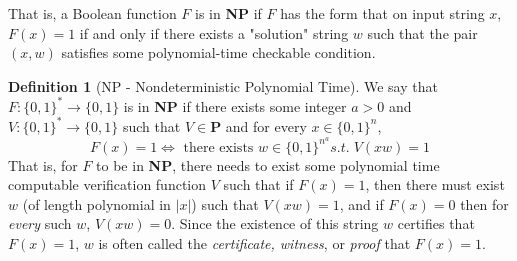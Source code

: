 \documentclass[a4paper, 12pt]{report}
\theoremstyle{remark}
\theoremstyle{definition}
\newtheorem{definition}{Definition}[section]
\begin{document}
That is, a Boolean function $F$ is in \textbf{NP} if $F$ has the form that on input string $x$, $F(x) = 1$ if and only if there exists a "solution" string $w$ such that the pair $(x, w)$ satisfies some polynomial-time checkable condition. 

\begin{definition}[NP - Nondeterministic Polynomial Time]
We say that $F: \{0,1\}^* \longrightarrow \{0,1\}$ is in \textbf{NP} if there exists some integer $a > 0$ and $V: \{0,1\}^* \longrightarrow \{0,1\}$ such that $V \in \mathbf{P}$ and for every $x \in \{0,1\}^n$, 
\[F(x) = 1 \iff \text{ there exists } w \in \{0,1\}^{n^a} s.t. \; V(x w) = 1\]
That is, for $F$ to be in \textbf{NP}, there needs to exist some polynomial time computable verification function $V$ such that if $F(x) = 1$, then there must exist $w$ (of length polynomial in $|x|$) such that $V(x w) = 1$, and if $F(x) = 0$ then for \textit{every} such $w$, $V(xw) = 0$. Since the existence of this string $w$ certifies that $F(x) = 1$, $w$ is often called the \textit{certificate, witness}, or \textit{proof} that $F(x) = 1$. 
\end{definition}
\end{document}

